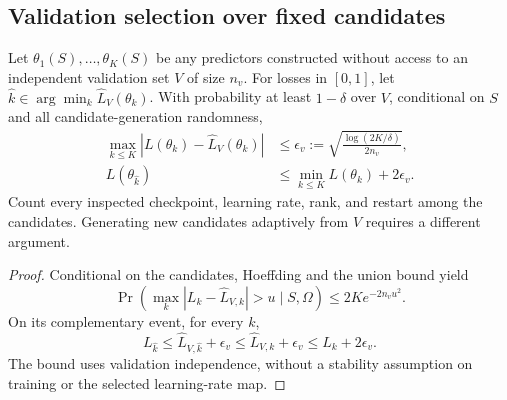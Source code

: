 \subsection{Validation selection over fixed candidates}
\label{app:validation-selection}
\begin{theorem}
Let $\theta_1(S),\ldots,\theta_K(S)$ be any predictors constructed without
access to an independent validation set $V$ of size $n_v$. For losses in
$[0,1]$, let $\widehat k\in\arg\min_k\widehat L_V(\theta_k)$.
With probability at least $1-\delta$ over $V$, conditional on $S$ and all
candidate-generation randomness,
\begin{align}
 \max_{k\le K}|L(\theta_k)-\widehat L_V(\theta_k)|
 &\le\epsilon_v:=\sqrt{\frac{\log(2K/\delta)}{2n_v}},\\
 L(\theta_{\widehat k})&\le\min_{k\le K}L(\theta_k)+2\epsilon_v.
 \label{eq:validation-oracle}
\end{align}
Count every inspected checkpoint, learning rate, rank, and restart among
the candidates. Generating new candidates adaptively from $V$ requires
a different argument.
\end{theorem}
\begin{proof}
Conditional on the candidates, Hoeffding and the union bound yield
\begin{equation}
 \Pr\!\left(\max_k|L_k-\widehat L_{V,k}|>u\mid S,\Omega\right)
 \le2K e^{-2n_vu^2}.
\end{equation}
On its complementary event, for every $k$,
\begin{equation}
 L_{\widehat k}\le\widehat L_{V,\widehat k}+\epsilon_v
 \le\widehat L_{V,k}+\epsilon_v\le L_k+2\epsilon_v.
\end{equation}
The bound uses validation independence, without a stability assumption
on training or the selected learning-rate map.
\end{proof}

